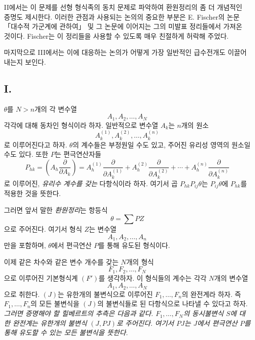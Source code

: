 II에서는 이 문제를 선형 형식족의 동치 문제로 파악하여 환원정리의 좀 더 개념적인 증명도 제시한다. 이러한 관점과 사용되는 논의의 중요한 부분은 E. Fischer의 논문 「대수적 가군계에 관하여」 및 그 논문에 이어지는 그의 미발표 정리들에서 가져온 것이다. Fischer는 이 정리들을 사용할 수 있도록 매우 친절하게 허락해 주었다.

마지막으로 III에서는 이에 대응하는 논의가 어떻게 가장 일반적인 급수전개도 이끌어 내는지 보인다.

\subsection*{I.}
$\theta$를 $N>n$개의 각 변수열
\[
  A_1,A_2,\ldots,A_N
\]
각각에 대해 동차인 형식이라 하자. 일반적으로 변수열 $A_k$는 $n$개의 원소
\[
  A_k^{(1)},A_k^{(2)},\ldots,A_k^{(n)}
\]
로 이루어진다고 하자. $\theta$의 계수들은 부정원일 수도 있고, 주어진 유리성 영역의 원소일 수도 있다. 또한 $P$는 편극연산자들
\[
  P_{hk}=\left(A_h\frac{\partial}{\partial A_k}\right)
  =A_h^{(1)}\frac{\partial}{\partial A_k^{(1)}}+
   A_h^{(2)}\frac{\partial}{\partial A_k^{(2)}}+
   \cdots+
   A_h^{(n)}\frac{\partial}{\partial A_k^{(n)}}
\]
로 이루어진, \emph{유리수 계수를 갖는} 다항식이라 하자. 여기서 곱 $P_{hk}P_{ij}\theta$는 $P_{ij}\theta$에 $P_{hk}$를 적용한 것을 뜻한다.

그러면 앞서 말한 \emph{환원정리}는 항등식
\begin{equation}
  \theta=\sum PZ
\tag{1}
\end{equation}
으로 주어진다. 여기서 형식 $Z$는 변수열
\[
  A_1,A_2,\ldots,A_n
\]
만을 포함하며, $\theta$에서 편극연산 $P$를 통해 유도된 형식이다.

이제 같은 차수와 같은 변수 개수를 갖는 $N$개의 형식
\[
  F_1,F_2,\ldots,F_N
\]
으로 이루어진 기본형식계 $(F')$를 생각하자. 이 형식들의 계수는 각각 $N$개의 변수열
\[
  A_1,A_2,\ldots,A_N
\]
으로 취한다. $(J)$는 유한개의 불변식으로 이루어진 $F_1,\ldots,F_n$의 완전계라 하자. 즉 $F_1,\ldots,F_n$의 모든 불변식을 $(J)$의 불변식들로 된 다항식으로 나타낼 수 있다고 하자. \emph{그러면 증명해야 할 힐베르트의 추측은 다음과 같다. $F_1,\ldots,F_N$의 동시불변식 $S$에 대한 완전계는 유한개의 불변식 $(J,PJ)$로 주어진다. 여기서 $PJ$는 $J$에서 편극연산 $P$를 통해 유도할 수 있는 모든 불변식을 뜻한다.}

